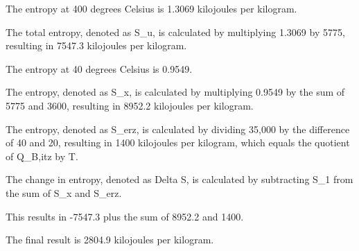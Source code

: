 The entropy at 400 degrees Celsius is 1.3069 kilojoules per kilogram.

The total entropy, denoted as S_u, is calculated by multiplying 1.3069 by 5775, resulting in 7547.3 kilojoules per kilogram.

The entropy at 40 degrees Celsius is 0.9549.

The entropy, denoted as S_x, is calculated by multiplying 0.9549 by the sum of 5775 and 3600, resulting in 8952.2 kilojoules per kilogram.

The entropy, denoted as S_erz, is calculated by dividing 35,000 by the difference of 40 and 20, resulting in 1400 kilojoules per kilogram, which equals the quotient of Q_B,itz by T.

The change in entropy, denoted as Delta S, is calculated by subtracting S_1 from the sum of S_x and S_erz.

This results in -7547.3 plus the sum of 8952.2 and 1400.

The final result is 2804.9 kilojoules per kilogram.